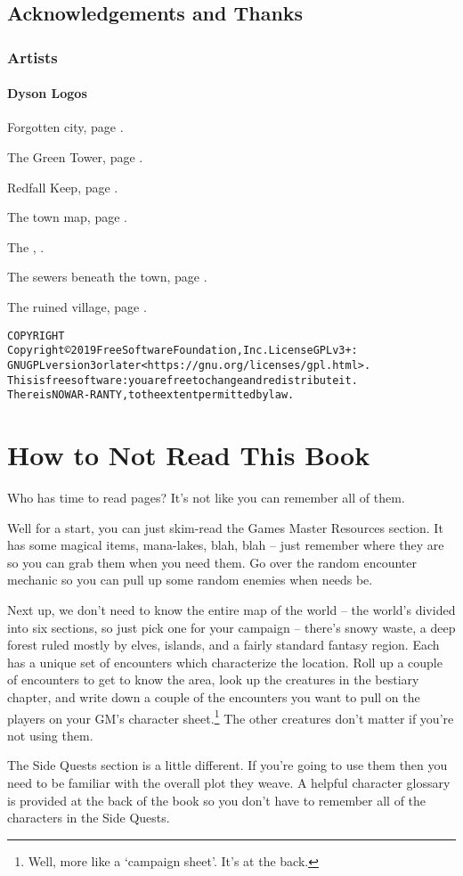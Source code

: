 
\section*{Acknowledgements and Thanks}

\subsection*{Artists}

\subsubsection{Dyson Logos}

Forgotten city, page \pageref{lost_city_map}.

The Green Tower, page \pageref{green_tower_map}.

Redfall Keep, page \pageref{redfall_keep_map}.

The town map, page \pageref{town_map}.

The , \pageref{mincing_pig_map}.

The sewers beneath the town, page \pageref{sewer_map}.

The ruined village, page \pageref{ruined_village_map}.

\begin{alltt}
COPYRIGHT
       Copyright \copyright 2019 Free Software Foundation, Inc.  License GPLv3+:
	GNU GPL version 3 or later <https://gnu.org/licenses/gpl.html>.
       This is free software: you are free to change and redistribute it.
	There is NO WAR- RANTY, to the extent permitted by law.

\end{alltt}


\chapter*{How to Not Read This Book}

Who has time to read \pageref{lastpage} pages?  It's not like you can remember all of them.

Well for a start, you can just skim-read the Games Master Resources section.  It has some magical items, mana-lakes, blah, blah -- just remember where they are so you can grab them when you need them.  Go over the random encounter mechanic so you can pull up some random enemies when needs be.

Next up, we don't need to know the entire map of the world -- the world's divided into six sections, so just pick one for your campaign -- there's snowy waste, a deep forest ruled mostly by elves, islands, and a fairly standard fantasy region.  Each has a unique set of encounters which characterize the location.  Roll up a couple of encounters to get to know the area, look up the creatures in the bestiary chapter, and write down a couple of the encounters you want to pull on the players on your GM's character sheet.\footnote{Well, more like a `campaign sheet'.  It's at the back.}  The other creatures don't matter if you're not using them.

The Side Quests section is a little different.  If you're going to use them then you need to be familiar with the overall plot they weave.  A helpful character glossary is provided at the back of the book so you don't have to remember all of the characters in the Side Quests.


